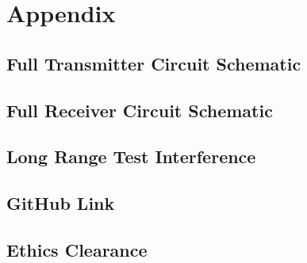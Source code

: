\documentclass[11pt]{report}
\begin{document}
\newpage

\chapter{Appendix}\label{ch:appendix}

\section{Full Transmitter Circuit Schematic}


\section{Full Receiver Circuit Schematic}


\section{Long Range Test Interference}

\section{GitHub Link}

\section{Ethics Clearance}
\end{document}
